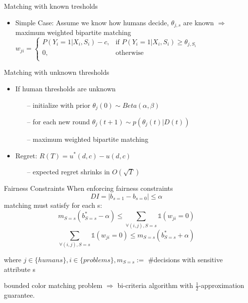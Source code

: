 \documentclass[11pt]{beamer}
\begin{document}
\begin{frame}{Matching with known tresholds}
\begin{itemize}
\item Simple Case: Assume we know how humans decide, \newline$\theta_{j,s}$ are known
$\Rightarrow$ maximum weighted bipartite matching
$
w_{ji} = 
\begin{cases}
P(Y_i=1|X_i,S_i)-c, & \text{if } P(Y_i=1|X_i,S_i)\ge \theta_{j,S_i} \\
0, & \text{otherwise} \\
\end{cases}
$
\end{itemize}
\end{frame}

\begin{frame}{Matching with unknown thresholds}
\begin{itemize}
\item If human thresholds are unknown
\begin{itemize}
\normalsize
\setlength\itemsep{0.5em}
\item[--] initialize with prior $\theta_j(0) \sim Beta(\alpha ,\beta)$
\item[--] for each new round
$\theta_j(t+1) \sim p(\theta_j(t)|D(t))$
\item[--] maximum weighted bipartite matching
\end{itemize}
\end{itemize}
\begin{itemize}
\item Regret:
\quad $R(T)=u^*(d,c)-u(d,c)$
\begin{itemize}
\item[--] expected regret shrinks in $O(\sqrt{T})$
\end{itemize}
\end{itemize}
\end{frame}

\begin{frame}{Fairness Constraints}
When enforcing fairness constraints
$$DI=|b_{s=1}-b_{s=0}|\le \alpha$$
matching must satisfy for each s:
$$ m_{S=s}(b_{S=s}^*-\alpha)\le \sum_{\forall (i,j), S=s}\mathbb{1} (w_{ji}= 0)$$
$$\sum_{\forall (i,j), S=s}\mathbb{1} (w_{ji}= 0) \le  m_{S=s}(b_{S=s}^*+\alpha)$$
\scriptsize{
\begin{center}
    where $j\in\{humans\},i\in\{problems\}, m_{S=s}:=$ \#decisions with sensitive attribute s
\end{center}
}
\normalsize
bounded color matching problem 
$\Rightarrow$ bi-criteria algorithm with $\frac{1}{2}$-approximation guarantee.
\end{frame}
\end{document}
